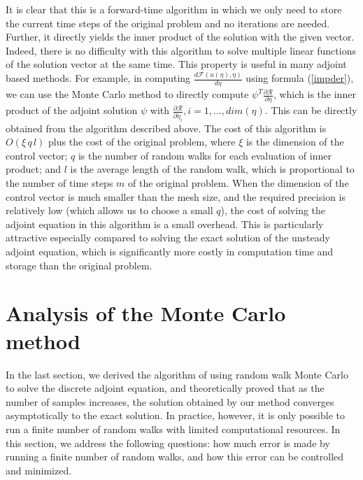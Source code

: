 \documentclass{elsart}
\theoremstyle{remark}
\theoremstyle{definition}
\theoremstyle{proof}
\begin{document}
        It is clear that this is a forward-time algorithm in which we only
        need to store the current time steps of the original problem and
        no iterations are needed.  Further, it directly yields the inner
        product of the solution with the given vector.  Indeed, there is no
        difficulty with this algorithm to solve multiple linear functions
        of the solution vector at the same time.  This property is useful
        in many adjoint based methods.  For example, in computing
        $ \frac{d\mathcal{F}(u(\eta),\eta)}{d\eta} $ using formula
        (\ref{impder}), we can use the Monte Carlo method to directly compute
        $ \psi^T \frac{\partial \mathcal{R}}{\partial \eta} $,
        which is the inner product of the adjoint solution $\psi$ with
        $\frac{\partial \mathcal{R}}{\partial \eta_i}, i=1,...,dim(\eta)$.
        This can be directly obtained from the algorithm described above.
        The cost of this algorithm is $O(\xi\, q\, l)$ plus the cost of
        the original problem, where $\xi$ is the dimension of the control
        vector; $q$ is the number of random walks for each evaluation of
        inner product; and $l$ is the average length of the random walk,
        which is proportional to the number of time steps $m$ of the original
        problem.  When the dimension of the control vector is much smaller
        than the mesh size, and the required precision is relatively low
        (which allows us to choose a small $q$), the cost of solving the
        adjoint equation in this algorithm is a small overhead.  This is
        particularly attractive especially compared to solving the exact
        solution of the unsteady adjoint equation, which is significantly
        more costly in computation time and storage than the original problem.
    


\section{Analysis of the Monte Carlo method}
    In the last section, we derived the algorithm of using random walk Monte
    Carlo to solve the discrete adjoint equation, and theoretically proved that
    as the number of samples increases, the solution obtained by our method
    converges asymptotically to the exact solution.  In practice, however,
    it is only possible to run a finite number of random walks with limited
    computational resources.  In this section, we address the following
    questions: how much error is made by running a finite number of random
    walks, and how this error can be controlled and minimized.
    
\end{document}
